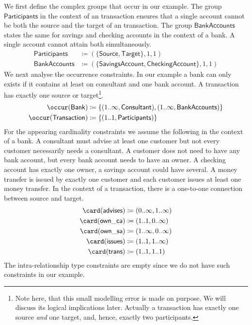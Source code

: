 \begin{example}
  We first define the complex \rosirole groups that occur in our example. The \rosirole group
  $\mathsf{Participants}$ in the context of an transaction ensures that a single account cannot be
  both the source and the target of an transaction. The \rosirole group $\mathsf{BankAccounts}$
  states the same for savings and checking accounts in the context of a bank. A single account
  cannot attain both \rosiroles simultaneously. 
  \begin{align*}
    \mathsf{Participants} & \coloneqq (\{\mathsf{Source}, \mathsf{Target}\},1,1)\\
    \mathsf{BankAccounts} & \coloneqq (\{\mathsf{SavingsAccount}, \mathsf{CheckingAccount}\},1,1)
  \end{align*}
  We next analyse the occurrence constraints. In our example a bank can only exists if it contains
  at least on consultant and one bank account. A transaction has exactly one source or
  target\footnote{Note here, that this small modelling error is made on purpose. We will discuss its
    logical implications later. Actually a transaction has exactly one source \emph{and} one target,
    and, hence, exactly two participants.}.
  \begin{align*}
    \occur(\mathsf{Bank}) & \coloneqq \{(1..\infty, \mathsf{Consultant}), (1..\infty, \mathsf{BankAccounts})\}\\
    \occur(\mathsf{Transaction}) & \coloneqq \{(1..1,\mathsf{Participants})\}
  \end{align*}
  For the appearing cardinality constraints we assume the following in the context of a bank. A
  consultant must advise at least one customer but not every customer necessarily needs a
  consultant. A customer does not need to have any bank account, but every bank account needs to
  have an owner. A checking account has exactly one owner, a savings account could have several. A
  money transfer is issued by exactly one customer and each customer issues at least one money
  transfer. In the context of a transaction, there is a one-to-one connection between source and
  target. 
  \begin{align*}
    \card(\mathsf{advises}) & \coloneqq (0..\infty,1..\infty)\\
    \card(\mathsf{own\_ca}) & \coloneqq (1..1,0..\infty)\\
    \card(\mathsf{own\_sa}) & \coloneqq (1..\infty,0..\infty)\\
    \card(\mathsf{issues}) & \coloneqq (1..1,1..\infty)\\
    \card(\mathsf{trans}) & \coloneqq (1..1,1..1)
  \end{align*}
  The intra-relationship type constraints are empty since we do not have such constraints in our
  example. 
\end{example}




